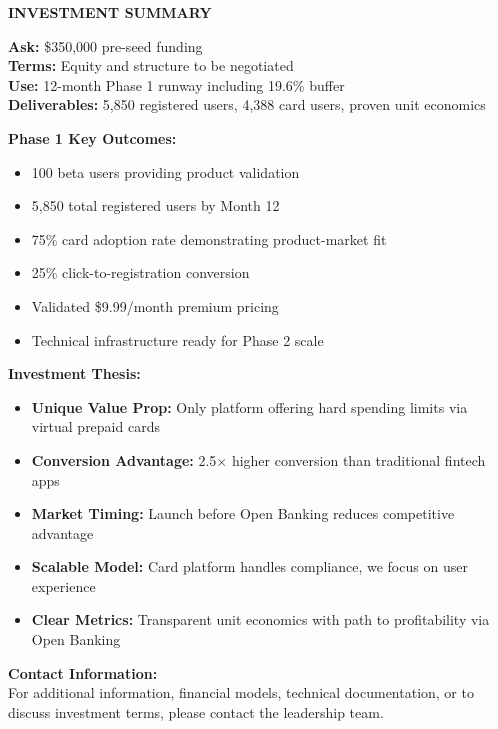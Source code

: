 \documentclass[11pt,letterpaper]{article}
\begin{document}
\newpage

\begin{center}
\textbf{\Large INVESTMENT SUMMARY}

\textbf{Ask:} \$350,000 pre-seed funding \\
\textbf{Terms:} Equity and structure to be negotiated \\
\textbf{Use:} 12-month Phase 1 runway including 19.6\% buffer \\
\textbf{Deliverables:} 5,850 registered users, 4,388 card users, proven unit economics

\vspace{1cm}

\textbf{Phase 1 Key Outcomes:}
\begin{itemize}
\item 100 beta users providing product validation
\item 5,850 total registered users by Month 12
\item 75\% card adoption rate demonstrating product-market fit
\item 25\% click-to-registration conversion
\item Validated \$9.99/month premium pricing
\item Technical infrastructure ready for Phase 2 scale
\end{itemize}

\vspace{1cm}

\textbf{Investment Thesis:}
\begin{itemize}
\item \textbf{Unique Value Prop:} Only platform offering hard spending limits via virtual prepaid cards
\item \textbf{Conversion Advantage:} 2.5× higher conversion than traditional fintech apps
\item \textbf{Market Timing:} Launch before Open Banking reduces competitive advantage
\item \textbf{Scalable Model:} Card platform handles compliance, we focus on user experience
\item \textbf{Clear Metrics:} Transparent unit economics with path to profitability via Open Banking
\end{itemize}

\vspace{1cm}

\textbf{Contact Information:} \\
For additional information, financial models, technical documentation, or to discuss investment terms, please contact the leadership team.
\end{center}
\end{document}
